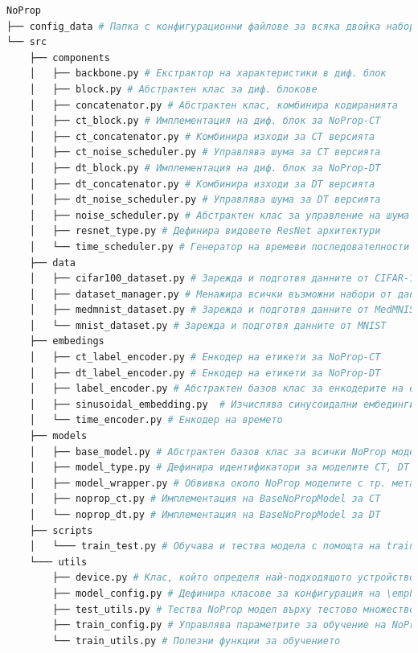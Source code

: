 \documentclass[a4paper,11pt]{article}
\begin{document}
\begin{lstlisting}[style=tree, language=bash]
NoProp
├── config_data # Папка с конфигурационни файлове за всяка двойка набор и алгоритъм
└── src         
    ├── components  
    │   ├── backbone.py # Eкстрактор на характеристики в диф. блок
    │   ├── block.py # Абстрактен клас за диф. блокове
    │   ├── concatenator.py # Абстрактен клас, комбинира кодиранията
    │   ├── ct_block.py # Имплементация на диф. блок за NoProp-CT
    │   ├── ct_concatenator.py # Комбинира изходи за CT версията 
    │   ├── ct_noise_scheduler.py # Управлява шумa за CT версията
    │   ├── dt_block.py # Имплементация на диф. блок за NoProp-DT
    │   ├── dt_concatenator.py # Комбинира изходи за DT версията 
    │   ├── dt_noise_scheduler.py # Управлява шума за DT версията 
    │   ├── noise_scheduler.py # Абстрактен клас за управление на шума
    │   ├── resnet_type.py # Дефинира видовете ResNet архитектури
    │   └── time_scheduler.py # Генератор на времеви последователности
    ├── data  
    │   ├── cifar100_dataset.py # Зарежда и подготвя данните от CIFAR-100 
    │   ├── dataset_manager.py # Менажира всички възможни набори от данни 
    │   ├── medmnist_dataset.py # Зарежда и подготвя данните от MedMNIST+ 
    │   └── mnist_dataset.py # Зарежда и подготвя данните от MNIST  
    ├── embedings  
    │   ├── ct_label_encoder.py # Енкодер на етикети за NoProp-CT
    │   ├── dt_label_encoder.py # Енкодер на етикети за NoProp-DT
    │   ├── label_encoder.py # Абстрактен базов клас за енкодерите на етикети
    │   ├── sinusoidal_embedding.py  # Изчислява синусоидални ембединги
    │   └── time_encoder.py # Енкодер на времето
    ├── models  
    │   ├── base_model.py # Абстрактен базов клас за всички NoProp модели
    │   ├── model_type.py # Дефинира идентификатори за моделите CT, DT и FM
    │   ├── model_wrapper.py # Обвивка около NoProp моделите с тр. метаданни
    │   ├── noprop_ct.py # Имплементация на BaseNoPropModel за CT
    │   └── noprop_dt.py # Имплементация на BaseNoPropModel за DT
    ├── scripts  
    │   └─── train_test.py # Обучава и тества модела с помощта на train\_utils
    └─── utils  
        ├── device.py # Клас, който определя най-подходящото устройство за обучение
        ├── model_config.py # Дефинира класове за конфигурация на \emph{NoProp} модел
        ├── test_utils.py # Тества NoProp модел върху тестово множество от данни
        ├── train_config.py # Управлява параметрите за обучение на NoProp
        └── train_utils.py # Полезни функции за обучението
\end{lstlisting} 
\end{document}
